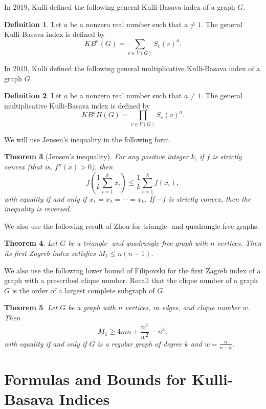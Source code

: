 \documentclass[11pt, oneside]{amsart}   	%
\newtheorem{theorem}{Theorem}[section]
\theoremstyle{definition}
\newtheorem{definition}[theorem]{Definition}
\theoremstyle{remark}
\numberwithin{equation}{section}
\begin{document}
In 2019, Kulli \cite{VK2019} defined the following general Kulli-Basava index of a graph $G$.

\begin{definition} Let $a$ be a nonzero real number such that $a\neq 1$. The general Kulli-Basava index is defined by
    \[KB^a(G)=\sum_{v\in V(G)} S_e(v)^a.\]

\end{definition}

In 2019, Kulli \cite{kulli2019multiplicative} defined the following general multiplicative Kulli-Basava index of a graph $G$.

\begin{definition} Let $a$ be a nonzero real number such that $a\neq 1$. The general multiplicative Kulli-Basava index is defined by
\[KB^a\Pi(G)=\prod_{v\in V(G)} S_e(v)^a.\]

\end{definition}
We will use Jensen's inequality in the following form.

\begin{theorem}[Jensen's inequality]\label{Jensen}
For any positive integer $k$, if $f$ is strictly convex (that is, $f''(x)>0$), then
\[
f\left(\frac{1}{k}\sum_{i=1}^{k}x_i\right)\leq \frac{1}{k}\sum_{i=1}^{k}f(x_i),
\]
with equality if and only if $x_1=x_2=\cdots=x_k$. If $-f$ is strictly convex, then the inequality is reversed.
\end{theorem}


We also use the following result of Zhou \cite{zhou2006note} for triangle- and quadrangle-free graphs.

\begin{theorem}
Let $G$ be a triangle- and quadrangle-free graph with $n$ vertices. Then its first Zagreb index satisfies $M_1\leq n(n-1)$.
\end{theorem}

We also use the following lower bound of Filipovski \cite{filipovski2021new} for the first Zagreb index of a graph with a prescribed clique number. Recall that the clique number of a graph $G$ is the order of a largest complete subgraph of $G$.

\begin{theorem} Let $G$ be a graph with $n$ vertices, $m$ edges, and clique number $w$. Then
\[
M_1\geq 4mn+\frac{n^3}{w^2}-n^3,
\]
with equality if and only if $G$ is a regular graph of degree $k$ and $w=\frac{n}{n-k}$.
\end{theorem}

\section{Formulas and Bounds for Kulli-Basava Indices}
\end{document}
